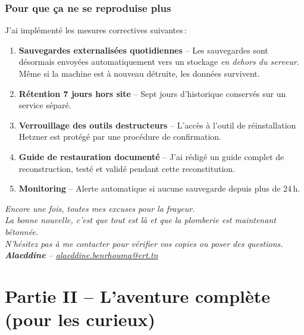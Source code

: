 \documentclass[11pt,a4paper]{article}
\begin{document}
\section{Pour que \c{c}a ne se reproduise plus}

J'ai impl\'{e}ment\'{e} les mesures correctives suivantes\,:

\begin{enumerate}
	\item \textbf{Sauvegardes externalis\'{e}es quotidiennes} -- Les sauvegardes sont d\'{e}sormais envoy\'{e}es automatiquement vers un stockage \emph{en dehors du serveur}. M\^{e}me si la machine est \`{a} nouveau d\'{e}truite, les donn\'{e}es survivent.
	\item \textbf{R\'{e}tention 7 jours hors site} -- Sept jours d'historique conserv\'{e}s sur un service s\'{e}par\'{e}.
	\item \textbf{Verrouillage des outils destructeurs} -- L'acc\`{e}s \`{a} l'outil de r\'{e}installation Hetzner est prot\'{e}g\'{e} par une proc\'{e}dure de confirmation.
	\item \textbf{Guide de restauration document\'{e}} -- J'ai r\'{e}dig\'{e} un guide complet de reconstruction, test\'{e} et valid\'{e} pendant cette reconstitution.
	\item \textbf{Monitoring} -- Alerte automatique si aucune sauvegarde depuis plus de 24\,h.
\end{enumerate}

\vspace{0.5cm}
\begin{graybox}
	\centering\itshape\sffamily
	Encore une fois, toutes mes excuses pour la frayeur.\\
	La bonne nouvelle, c'est que tout est l\`{a} et que la plomberie est maintenant b\'{e}tonn\'{e}e.\\[6pt]
	N'h\'{e}sitez pas \`{a} me contacter pour v\'{e}rifier vos copies ou poser des questions.\\[6pt]
	\textbf{Alaeddine} -- \href{mailto:alaeddine.benrhouma@ert.tn}{alaeddine.benrhouma@ert.tn}
\end{graybox}

\newpage

\part*{Partie II -- L'aventure compl\`{e}te (pour les curieux)}
\vspace{0.3cm}
\end{document}
